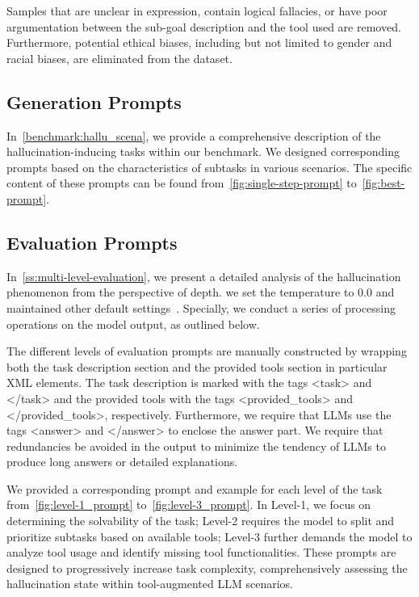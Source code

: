 \documentclass[11pt]{article}
\begin{document}
Samples that are unclear in expression, contain logical fallacies, or have poor argumentation between the sub-goal description and the tool used are removed. 
Furthermore, potential ethical biases, including but not limited to gender and racial biases, are eliminated from the dataset.

\subsection{Generation Prompts}
\label{append:generation_prompt}

In~\cref{benchmark:hallu_scena}, we provide a comprehensive description of the hallucination-inducing tasks within our benchmark. 
We designed corresponding prompts based on the characteristics of subtasks in various scenarios. 
The specific content of these prompts can be found from~\cref{fig:single-step-prompt} to~\cref{fig:best-prompt}.


\subsection{Evaluation Prompts}

In~\cref{ss:multi-level-evaluation}, we present a detailed analysis of the hallucination phenomenon from the perspective of depth. we set the temperature to $0.0$ and maintained other default settings~\cite{shi2024thorough}.
Specially, we conduct a series of processing operations on the model output, as outlined below.

The different levels of evaluation prompts are manually constructed by wrapping both the task description section and the provided tools section in particular XML elements. 
The task description is marked with the tags <task> and </task> and the provided tools with the tags <provided\_tools> and </provided\_tools>, respectively. Furthermore, we require that LLMs use the tags <answer> and </answer> to enclose the answer part. 
We require that redundancies be avoided in the output to minimize the tendency of LLMs to produce long answers or detailed explanations.

We provided a corresponding prompt and example for each level of the task from~\cref{fig:level-1_prompt} to~\cref{fig:level-3_prompt}. 
In Level-1, we focus on determining the solvability of the task; Level-2 requires the model to split and prioritize subtasks based on available tools; Level-3 further demands the model to analyze tool usage and identify missing tool functionalities. 
These prompts are designed to progressively increase task complexity, comprehensively assessing the hallucination state within tool-augmented LLM scenarios.
\end{document}

